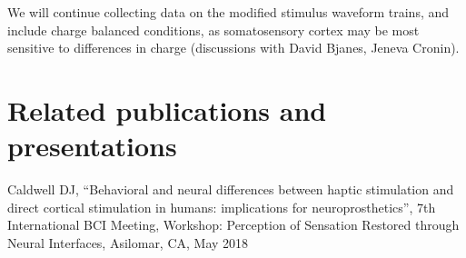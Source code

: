We will continue collecting data on the modified stimulus waveform trains, and include charge balanced conditions, as somatosensory cortex may be most sensitive to differences in charge (discussions with David Bjanes, Jeneva Cronin). 

\section{Related publications and presentations}

\noindent Caldwell DJ, “Behavioral and neural differences between haptic stimulation and direct cortical stimulation in humans: implications for neuroprosthetics”, 7th International BCI Meeting, Workshop: Perception of Sensation Restored through Neural Interfaces, Asilomar, CA, May 2018